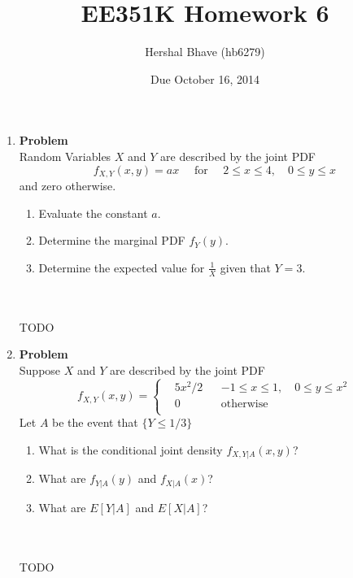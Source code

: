 \documentclass[12pt]{article}
\title{EE351K Homework 6}
\author{Hershal Bhave (hb6279)}
\date{Due October 16, 2014}
\newenvironment{Ex}{\textbf{Problem}\vspace{.75em}\\}{}
\begin{document}
\maketitle
\begin{enumerate}
\item
  \begin{Ex}
    Random Variables $X$ and $Y$ are described by the joint PDF
    \begin{equation}
      \label{eq:1-question}
      f_{X,Y}(x,y) = ax \quad
      \text{ for }\quad 2\le x\le 4,\quad 0\le y \le x
    \end{equation}
    and zero otherwise.
    \begin{enumerate}
    \item Evaluate the constant $a$.
    \item Determine the marginal PDF $f_Y(y)$.
    \item Determine the expected value for $\frac{1}{X}$ given that $Y=3$.
    \end{enumerate}
    \begin{solution} \hfill \\\\ {\huge TODO}
    \end{solution}
  \end{Ex}
\item
  \begin{Ex}
    Suppose $X$ and $Y$ are described by the joint PDF
    \begin{equation}
      \label{eq:2-question}
      f_{X,Y}(x,y) = \left\{
        \begin{aligned}
          &5x^2/2 && -1 \le x \le 1, \quad 0\le y \le x^2 \\
          &0 && \text{otherwise} \\
        \end{aligned} \right.
    \end{equation}
    Let $A$ be the event that $\{Y\le 1/3\}$
    \begin{enumerate}
    \item What is the conditional joint density $f_{X,Y|A}(x,y)$?
    \item What are $f_{Y|A}(y)$ and $f_{X|A}(x)$?
    \item What are $E[Y|A]$ and $E[X|A]$?
    \end{enumerate}
    \begin{solution} \hfill \\\\ {\huge TODO}
    \end{solution}

\end{Ex}
\end{enumerate}
\end{document}
